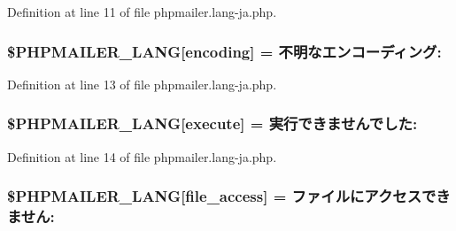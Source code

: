 Definition at line 11 of file phpmailer.\+lang-\/ja.\+php.

\subsubsection[{\texorpdfstring{\$\+P\+H\+P\+M\+A\+I\+L\+E\+R\+\_\+\+L\+A\+NG}{$PHPMAILER_LANG}}]{\setlength{\rightskip}{0pt plus 5cm}\$P\+H\+P\+M\+A\+I\+L\+E\+R\+\_\+\+L\+A\+NG\mbox{[}\textquotesingle{}encoding\textquotesingle{}\mbox{]} = \textquotesingle{}不明なエンコーディング\+: \textquotesingle{}}\hypertarget{phpmailer_8lang-ja_8php_a817f7283f3d54c970a0c10305cc668cc}{}\label{phpmailer_8lang-ja_8php_a817f7283f3d54c970a0c10305cc668cc}


Definition at line 13 of file phpmailer.\+lang-\/ja.\+php.

\subsubsection[{\texorpdfstring{\$\+P\+H\+P\+M\+A\+I\+L\+E\+R\+\_\+\+L\+A\+NG}{$PHPMAILER_LANG}}]{\setlength{\rightskip}{0pt plus 5cm}\$P\+H\+P\+M\+A\+I\+L\+E\+R\+\_\+\+L\+A\+NG\mbox{[}\textquotesingle{}execute\textquotesingle{}\mbox{]} = \textquotesingle{}実行できませんでした\+: \textquotesingle{}}\hypertarget{phpmailer_8lang-ja_8php_a668217a9563a168f30f2a8548b6ed5a9}{}\label{phpmailer_8lang-ja_8php_a668217a9563a168f30f2a8548b6ed5a9}


Definition at line 14 of file phpmailer.\+lang-\/ja.\+php.

\subsubsection[{\texorpdfstring{\$\+P\+H\+P\+M\+A\+I\+L\+E\+R\+\_\+\+L\+A\+NG}{$PHPMAILER_LANG}}]{\setlength{\rightskip}{0pt plus 5cm}\$P\+H\+P\+M\+A\+I\+L\+E\+R\+\_\+\+L\+A\+NG\mbox{[}\textquotesingle{}file\+\_\+access\textquotesingle{}\mbox{]} = \textquotesingle{}ファイルにアクセスできません\+: \textquotesingle{}}\hypertarget{phpmailer_8lang-ja_8php_a7e83349023b856ef9e5c46e30ae6d51e}{}\label{phpmailer_8lang-ja_8php_a7e83349023b856ef9e5c46e30ae6d51e}


